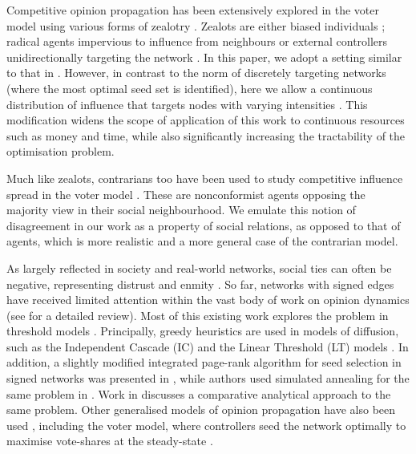 Competitive opinion propagation has been extensively explored in the voter model using various forms of zealotry \cite{acemouglu2013opinion,mobilia2007role,yildiz2013binary}. Zealots are either biased individuals \cite{masuda2010heterogeneous,mobilia2003does}; radical agents impervious to influence from neighbours  \cite{barrat2008dynamical,kuhlman2013controlling,mobilia2007role,mobilia2015nonlinear} or external controllers unidirectionally targeting the network \cite{masuda2015opinion}. In this paper, we adopt a setting similar to that in \cite{masuda2015opinion}. However, in contrast to the norm of discretely targeting networks (where the most optimal seed set is identified), here we allow a continuous distribution of influence that targets nodes with varying intensities \cite{chakraborty2019competitive}. This modification widens the scope of application of this work to continuous resources such as money and time, while also significantly increasing the tractability of the optimisation problem.
 
 Much like zealots, contrarians too have been used to study competitive influence spread in the voter model \cite{gambaro2017influence,li2011strategy,masuda2013voter,zhong2005effects}. These are nonconformist agents opposing the majority view in their social neighbourhood. 
 We emulate this notion of disagreement in our work as a property of social relations, as opposed to that of agents, which is more realistic and a more general case of the contrarian model. 


  As largely reflected in society and real-world networks, social ties can often be negative, representing distrust and enmity \cite{leskovec2010signed}.
 So far, networks with signed edges have received limited attention within the vast body of work on opinion dynamics (see \cite{girdhar2016signed} for a detailed review). Most of this existing work explores the problem in threshold models \cite{hosseini2019assessing}. Principally, greedy heuristics are used in models of diffusion, such as the Independent Cascade (IC) \cite{ju2020new,li2014polarity,liu2019influence} and the Linear Threshold (LT) models \cite{he2019information,liang2019influence,shen2015influence}. 
 In addition, a slightly modified integrated page-rank algorithm for seed selection in signed networks was presented in \cite{chen2015influence}, while authors used simulated annealing for the same problem in \cite{li2017positive}. Work in \cite{srivastava2015social} discusses a comparative analytical approach to the same problem. Other generalised models of opinion propagation have also been used \cite{jendoubi2016maximizing}, including the voter model, where controllers seed the network optimally to maximise vote-shares at the steady-state \cite{li2013influence}. 
 

